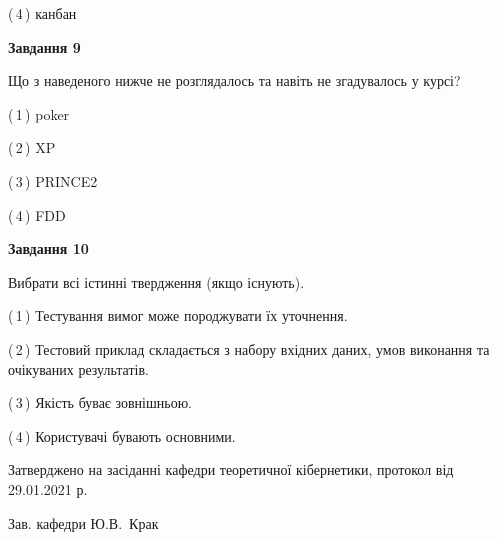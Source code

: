\documentclass[10pt, ukrainian]{article}
\begin{document}
{\begin {large}
(\,4\,) канбан%


{\begin {center}\textbf{Завдання 9}\end {center}}\par
Що з наведеного нижче не розглядалось та навіть не згадувалось у курсі?\par
\vspace{2mm}



(\,1\,) poker%



(\,2\,) XP%



(\,3\,) PRINCE2%



(\,4\,) FDD%


{\begin {center}\textbf{Завдання 10}\end {center}}\par
Вибрати всі істинні твердження (якщо існують).\par
\vspace{2mm}



(\,1\,) Тестування вимог може породжувати їх уточнення.%



(\,2\,) Тестовий приклад складається з набору вхідних даних, умов виконання та очікуваних результатів.%



(\,3\,) Якість буває зовнішньою.%



(\,4\,) Користувачі бувають основними.%



\end {large}}
{\vspace{5mm}\smallskip \begin {small} Затверджено на засіданні кафедри теоретичної кібернетики, протокол  від   29.01.2021 р.\par\smallskip\smallskip
{\parbox {6.5 cm}{Зав. кафедри \dotfill Ю.В.~Крак}} \end{small}}
\newpage
\end{document}
